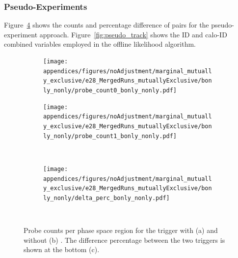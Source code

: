 \FloatBarrier
\subsubsection{Pseudo-Experiments}%
\label{top:pseudo_extra}

Figure~\ref{fig:pseudo_counts} shows the counts and percentage difference of
\tnp{} pairs for the pseudo-experiment approach. Figure~\ref{fig:pseudo_track}
shows the ID and calo-ID combined variables employed in the offline likelihood
algorithm.

\begin{figure}[b]
\begin{center}
\begin{subfigure}[c]{.48\textwidth}
\centering
\texttt{[image: appendices/figures/noAdjustment/marginal\_mutually\_exclusive/e28\_MergedRuns\_mutuallyExclusive/bonly\_nonly/probe\_count0\_bonly\_nonly.pdf]}
\caption{}%
\label{fig:pseudo_counts_without_ringer}
\end{subfigure}
\begin{subfigure}[c]{.48\textwidth}
\centering
\texttt{[image: appendices/figures/noAdjustment/marginal\_mutually\_exclusive/e28\_MergedRuns\_mutuallyExclusive/bonly\_nonly/probe\_count1\_bonly\_nonly.pdf]}
\caption{}%
\label{fig:pseudo_counts_with_ringer}
\end{subfigure} \\
\hspace*{\fill}
\begin{subfigure}[c]{.48\textwidth}
\centering
\caption{}%
\texttt{[image: appendices/figures/noAdjustment/marginal\_mutually\_exclusive/e28\_MergedRuns\_mutuallyExclusive/bonly\_nonly/delta\_perc\_bonly\_nonly.pdf]}
\label{fig:pseudo_delta_perc}
\end{subfigure}
\hspace*{\fill} \\
\caption{%
  Probe counts per phase space region for the trigger with (a) and without (b)
  \rnn{}. The difference percentage between the two triggers is shown at the
  bottom (c).
}%
\label{fig:pseudo_counts}
\end{center}
\end{figure}

